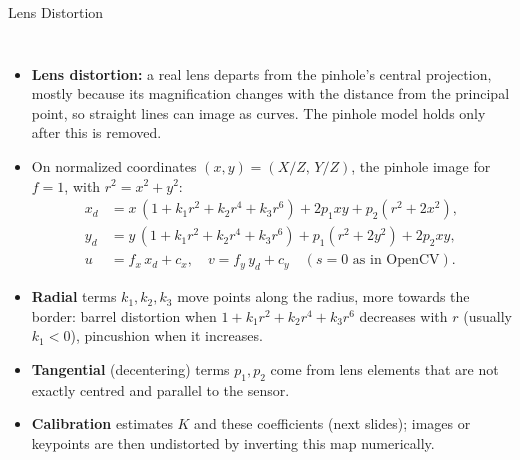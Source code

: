 \begin{frame}{Lens Distortion}
  \begin{columns}[T,onlytextwidth]
      \begin{itemize}\footnotesize\itemsep0.25em
        \item \textbf{Lens distortion:} a real lens departs from the pinhole's central projection, mostly because its magnification changes with the distance from the principal point, so straight lines can image as curves. The pinhole model holds only after this is removed.
        \item On normalized coordinates $(x,y)=(X/Z,\,Y/Z)$, the pinhole image for $f=1$, with $r^2=x^2+y^2$:
        \[ \begin{aligned} x_d &= x\,(1+k_1r^2+k_2r^4+k_3r^6) + 2p_1xy + p_2(r^2+2x^2),\\ y_d &= y\,(1+k_1r^2+k_2r^4+k_3r^6) + p_1(r^2+2y^2) + 2p_2xy,\\ u &= f_x\,x_d+c_x,\quad v = f_y\,y_d+c_y\quad (s=0\text{ as in OpenCV}). \end{aligned} \]
        \item \textbf{Radial} terms $k_1,k_2,k_3$ move points along the radius, more towards the border: barrel distortion when $1+k_1r^2+k_2r^4+k_3r^6$ decreases with $r$ (usually $k_1<0$), pincushion when it increases.
        \item \textbf{Tangential} (decentering) terms $p_1,p_2$ come from lens elements that are not exactly centred and parallel to the sensor.
        \item \textbf{Calibration} estimates $K$ and these coefficients (next slides); images or keypoints are then undistorted by inverting this map numerically.
      \end{itemize}
      \centering
\end{columns}
\end{frame}
